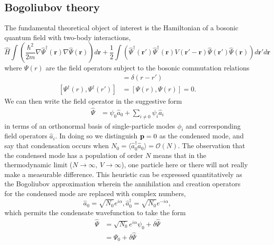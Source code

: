 \subsection*{Bogoliubov theory}
	The fundamental theoretical object of interest is the Hamiltonian of a bosonic quantum field with two-body interactions,
	\begin{equation}
		\hat{H} \int\left(\frac{\hbar^2}{2m}\nabla\hat{\Psi}^\dagger(\textbf{r})\nabla\hat{\Psi}(\textbf{r})\right)d\textbf{r} + \frac{1}{2}\int\left(\hat{\Psi}^\dagger(\textbf{r}')\hat{\Psi}^\dagger(\textbf{r})V(\textbf{r}'-\textbf{r}) \hat{\Psi}(\textbf{r}')\hat{\Psi}(\textbf{r})\right)d\textbf{r}'d\textbf{r}
		\label{eqn:ham}
	\end{equation}
	where $\Psi(r)$ are the field operators subject to the bosonic commutation relations
	\begin{align}
		[\Psi(r),\Psi^\dagger(r')] &= \delta(r-r')\\
		 [\Psi^\dagger(r),\Psi^\dagger(r')]&=[\Psi(r),\Psi(r)]=0.
	\end{align}	
	We can then write the field operator in the suggestive form	
	\begin{align}
		\hat{\Psi} &= \psi_0 \hat{a}_0 + \sum_{i\neq0}\psi_i \hat{a}_i
	\end{align}
	in terms of an orthonormal basis of single-particle modes $\phi_i$ and corresponding field operators $\hat{a}_i$.
	In doing so we distinguish $\textbf{p}=0$ as the condensed mode, and say that condensation occurs when $N_0=\langle\hat{a}^\dagger_0\hat{a}_0\rangle =\mathcal{O}(N)$.
	The observation that the condensed mode has a population of order $N$ means that in the thermodynamic limit ($N\rightarrow\infty,~V\rightarrow\infty$), one particle here or there will not really make a measurable difference.
	This heuristic can be expressed quantitatively as the Bogoliubov approximation wherein the annihilation and creation operators for the condensed mode are replaced with complex numbers,
	\begin{equation}
		\hat{a}_0 = \sqrt{N_0}e^{i\alpha}, \hat{a}_0^\dagger= \sqrt{N_0}e^{-i\alpha}, 
	\end{equation}
	which permits the condensate wavefunction to take the form
	\begin{align}
		\hat{\Psi} &= \sqrt{N_0}e^{i\alpha} \psi_0 + \delta\hat{\Psi}\\
					&= \Psi_0 + \delta\hat{\Psi}
	\end{align}


